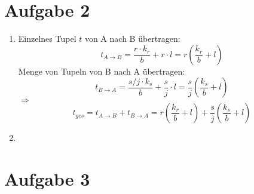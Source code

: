 \documentclass[a4paper]{article}
\begin{document}
\section*{Aufgabe 2}
\begin{enumerate}[label=\alph*)]
\item Einzelnes Tupel $t$ von A nach B übertragen: 
\[t_{A\rightarrow B} = \frac{r\cdot k_r}{b}+r\cdot l = r\left(\frac{k_r}{b} + l \right)\]
Menge von Tupeln von B nach A übertragen:
\[t_{B\rightarrow A} = \frac{s/j\cdot k_s}{b}+\frac{s}{j}\cdot l = \frac{s}{j}\left(\frac{k_s}{b} +l\right)\]
$\Rightarrow$ \[t_{ges} = t_{A\rightarrow B} + t_{B\rightarrow A} =  r\left(\frac{k_r}{b} + l \right) +  \frac{s}{j}\left(\frac{k_s}{b} +l\right)\]

\item
\end{enumerate}

\section*{Aufgabe 3}
\end{document}
